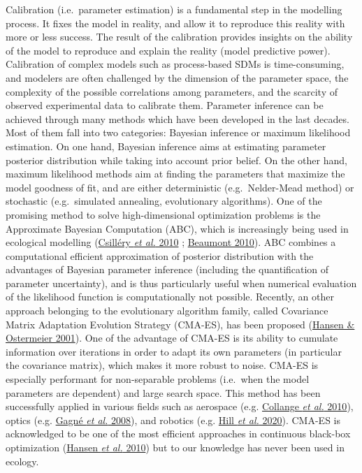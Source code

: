 \documentclass[11pt,]{article}
\begin{document}
Calibration (i.e.~parameter estimation) is a fundamental step in the
modelling process. It fixes the model in reality, and allow it to
reproduce this reality with more or less success. The result of the
calibration provides insights on the ability of the model to reproduce
and explain the reality (model predictive power). Calibration of complex
models such as process-based SDMs is time-consuming, and modelers are
often challenged by the dimension of the parameter space, the complexity
of the possible correlations among parameters, and the scarcity of
observed experimental data to calibrate them. Parameter inference can be
achieved through many methods which have been developed in the last
decades. Most of them fall into two categories: Bayesian inference or
maximum likelihood estimation. On one hand, Bayesian inference aims at
estimating parameter posterior distribution while taking into account
prior belief. On the other hand, maximum likelihood methods aim at
finding the parameters that maximize the model goodness of fit, and are
either deterministic (e.g.~Nelder-Mead method) or stochastic
(e.g.~simulated annealing, evolutionary algorithms). One of the
promising method to solve high-dimensional optimization problems is the
Approximate Bayesian Computation (ABC), which is increasingly being used
in ecological modelling (\protect\hyperlink{ref-Csillery2010}{Csilléry
\emph{et al.} 2010} ; \protect\hyperlink{ref-Beaumont2010}{Beaumont
2010}). ABC combines a computational efficient approximation of
posterior distribution with the advantages of Bayesian parameter
inference (including the quantification of parameter uncertainty), and
is thus particularly useful when numerical evaluation of the likelihood
function is computationally not possible. Recently, an other approach
belonging to the evolutionary algorithm family, called Covariance Matrix
Adaptation Evolution Strategy (CMA-ES), has been proposed
(\protect\hyperlink{ref-Hansen2001}{Hansen \& Ostermeier 2001}). One of
the advantage of CMA-ES is its ability to cumulate information over
iterations in order to adapt its own parameters (in particular the
covariance matrix), which makes it more robust to noise. CMA-ES is
especially performant for non-separable problems (i.e.~when the model
parameters are dependent) and large search space. This method has been
successfully applied in various fields such as aerospace (e.g.
\protect\hyperlink{ref-Collange2010}{Collange \emph{et al.} 2010}),
optics (e.g. \protect\hyperlink{ref-Gagne2008}{Gagné \emph{et al.}
2008}), and robotics (e.g. \protect\hyperlink{ref-Hill2020}{Hill
\emph{et al.} 2020}). CMA-ES is acknowledged to be one of the most
efficient approaches in continuous black-box optimization
(\protect\hyperlink{ref-Hansen2010}{Hansen \emph{et al.} 2010}) but to
our knowledge has never been used in ecology.
\end{document}
